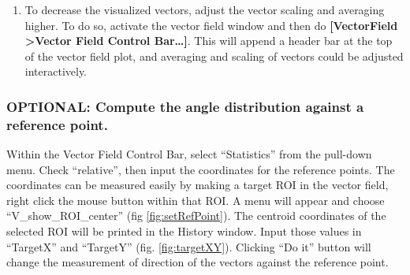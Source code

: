 \documentclass{article}
\begin{document}
\begin{enumerate}
\def\labelenumi{\arabic{enumi}.}
\setcounter{enumi}{3}
\item
  To decrease the visualized vectors, adjust the vector scaling and
  averaging higher. To do so, activate the vector field window and then
  do \textbf{{[}VectorField \textgreater{}Vector Field Control
  Bar\ldots{}{]}}. This will append a header bar at the top of the
  vector field plot, and averaging and scaling of vectors could be
  adjusted interactively.

\end{enumerate}

\subsubsection{OPTIONAL:  Compute the angle distribution against a reference point.}


 Within the Vector Field Control Bar, select ``Statistics''
  from the pull-down menu. Check ``relative'', then input the
  coordinates for the reference points. The coordinates can be measured
  easily by making a target ROI in the vector field, right click the
  mouse button within that ROI. A menu will appear and choose
  ``V\_show\_ROI\_center'' (fig \ref{fig:setRefPoint}). The centroid coordinates of the selected ROI will be printed in the History window. Input those values in ``TargetX'' and ``TargetY'' (fig. \ref{fig:targetXY}). Clicking ``Do it'' button will change the measurement of direction of the vectors against the reference point.

\end{document}

